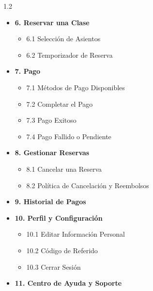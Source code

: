\documentclass[11pt,a4paper]{article}
\begin{document}
\begin{spacing}{1.2}
\begin{itemize}[label={}, leftmargin=0.5cm]
\begin{itemize}[label={}, leftmargin=0.5cm]
    \end{itemize}
  \item \textbf{6. Reservar una Clase} \dotfill \pageref{sec:reservar}
    \begin{itemize}[label={}, leftmargin=0.5cm]
      \item 6.1 Selección de Asientos \dotfill \pageref{sec:asientos}
      \item 6.2 Temporizador de Reserva \dotfill \pageref{sec:temporizador}
    \end{itemize}
  \item \textbf{7. Pago} \dotfill \pageref{sec:pago}
    \begin{itemize}[label={}, leftmargin=0.5cm]
      \item 7.1 Métodos de Pago Disponibles \dotfill \pageref{sec:metodos-pago}
      \item 7.2 Completar el Pago \dotfill \pageref{sec:completar-pago}
      \item 7.3 Pago Exitoso \dotfill \pageref{sec:pago-exitoso}
      \item 7.4 Pago Fallido o Pendiente \dotfill \pageref{sec:pago-fallido}
    \end{itemize}
  \item \textbf{8. Gestionar Reservas} \dotfill \pageref{sec:gestionar}
    \begin{itemize}[label={}, leftmargin=0.5cm]
      \item 8.1 Cancelar una Reserva \dotfill \pageref{sec:cancelar}
      \item 8.2 Política de Cancelación y Reembolsos \dotfill \pageref{sec:politica}
    \end{itemize}
  \item \textbf{9. Historial de Pagos} \dotfill \pageref{sec:historial}
  \item \textbf{10. Perfil y Configuración} \dotfill \pageref{sec:perfil}
    \begin{itemize}[label={}, leftmargin=0.5cm]
      \item 10.1 Editar Información Personal \dotfill \pageref{sec:editar-perfil}
      \item 10.2 Código de Referido \dotfill \pageref{sec:referido}
      \item 10.3 Cerrar Sesión \dotfill \pageref{sec:salir}
    \end{itemize}
  \item \textbf{11. Centro de Ayuda y Soporte} \dotfill \pageref{sec:ayuda}
\end{itemize}
\end{spacing}
\end{document}

